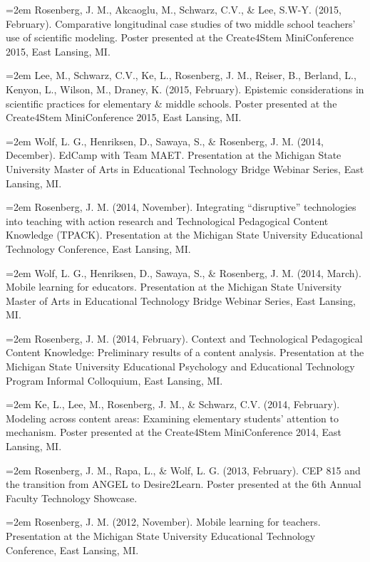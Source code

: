 \documentclass[14,]{article}
\begin{document}
\hangindent=2em Rosenberg, J. M., Akcaoglu, M., Schwarz, C.V., \& Lee,
S.W-Y. (2015, February). Comparative longitudinal case studies of two
middle school teachers' use of scientific modeling. Poster presented at
the Create4Stem MiniConference 2015, East Lansing, MI.

\hangindent=2em Lee, M., Schwarz, C.V., Ke, L., Rosenberg, J. M.,
Reiser, B., Berland, L., Kenyon, L., Wilson, M., Draney, K. (2015,
February). Epistemic considerations in scientific practices for
elementary \& middle schools. Poster presented at the Create4Stem
MiniConference 2015, East Lansing, MI.

\hangindent=2em Wolf, L. G., Henriksen, D., Sawaya, S., \& Rosenberg, J.
M. (2014, December). EdCamp with Team MAET. Presentation at the Michigan
State University Master of Arts in Educational Technology Bridge Webinar
Series, East Lansing, MI.

\hangindent=2em Rosenberg, J. M. (2014, November). Integrating
``disruptive'' technologies into teaching with action research and
Technological Pedagogical Content Knowledge (TPACK). Presentation at the
Michigan State University Educational Technology Conference, East
Lansing, MI.

\hangindent=2em Wolf, L. G., Henriksen, D., Sawaya, S., \& Rosenberg, J.
M. (2014, March). Mobile learning for educators. Presentation at the
Michigan State University Master of Arts in Educational Technology
Bridge Webinar Series, East Lansing, MI.

\hangindent=2em Rosenberg, J. M. (2014, February). Context and
Technological Pedagogical Content Knowledge: Preliminary results of a
content analysis. Presentation at the Michigan State University
Educational Psychology and Educational Technology Program Informal
Colloquium, East Lansing, MI.

\hangindent=2em Ke, L., Lee, M., Rosenberg, J. M., \& Schwarz, C.V.
(2014, February). Modeling across content areas: Examining elementary
students' attention to mechanism. Poster presented at the Create4Stem
MiniConference 2014, East Lansing, MI.

\hangindent=2em Rosenberg, J. M., Rapa, L., \& Wolf, L. G. (2013,
February). CEP 815 and the transition from ANGEL to Desire2Learn. Poster
presented at the 6th Annual Faculty Technology Showcase.

\hangindent=2em Rosenberg, J. M. (2012, November). Mobile learning for
teachers. Presentation at the Michigan State University Educational
Technology Conference, East Lansing, MI.
\end{document}
